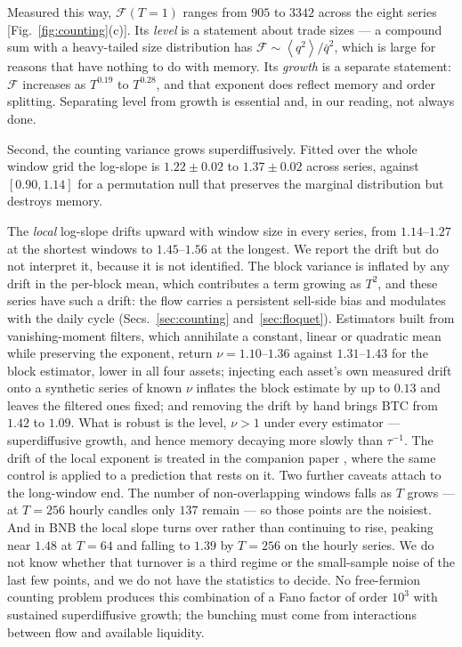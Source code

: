 \documentclass[aps,pre,twocolumn,superscriptaddress,floatfix,nofootinbib]{revtex4-2}
\newcommand{\avg}[1]{\left\langle #1 \right\rangle}
\begin{document}
Measured this way, $\mathcal{F}(T{=}1)$ ranges from $905$ to
$3342$ across the eight series [Fig.~\ref{fig:counting}(c)]. Its \emph{level}
is a statement about trade sizes --- a compound sum with a heavy-tailed size
distribution has $\mathcal{F}\sim\avg{q^2}/\bar q^{2}$, which is large for
reasons that have nothing to do with memory. Its \emph{growth} is a separate
statement: $\mathcal{F}$ increases as $T^{0.19}$ to $T^{0.28}$, and that
exponent does reflect memory and order splitting. Separating level from growth
is essential and, in our reading, not always done.

Second, the counting variance grows superdiffusively. Fitted over the whole
window grid the log-slope is $1.22\pm0.02$ to $1.37\pm0.02$ across series,
against $[0.90,1.14]$ for a permutation null that preserves the marginal
distribution but destroys memory.

The \emph{local} log-slope drifts upward with window size in every series, from
$1.14$--$1.27$ at the shortest windows to $1.45$--$1.56$ at the longest. We
report the drift but do not interpret it, because it is not identified. The
block variance is inflated by any drift in the per-block mean, which
contributes a term growing as $T^2$, and these series have such a drift: the
flow carries a persistent sell-side bias and modulates with the daily cycle
(Secs.~\ref{sec:counting} and~\ref{sec:floquet}). Estimators built from
vanishing-moment filters, which annihilate a constant, linear or quadratic
mean while preserving the exponent, return $\nu=1.10$--$1.36$ against
$1.31$--$1.43$ for the block estimator, lower in all four assets; injecting
each asset's own measured drift onto a synthetic series of known $\nu$ inflates
the block estimate by up to $0.13$ and leaves the filtered ones fixed; and
removing the drift by hand brings BTC from $1.42$ to $1.09$. What is robust is
the level, $\nu>1$ under every estimator --- superdiffusive growth, and hence
memory decaying more slowly than $\tau^{-1}$. The drift of the local exponent
is treated in the companion paper \cite{paper2}, where the same control is
applied to a prediction that rests on it. Two further caveats attach to the
long-window end. The number of non-overlapping windows falls as $T$ grows ---
at $T=256$ hourly candles only $137$ remain --- so those points are the
noisiest. And in BNB the local slope turns over rather than continuing to rise,
peaking near $1.48$ at $T=64$ and falling to $1.39$ by $T=256$ on the hourly
series. We do not know whether that turnover is a third regime or the
small-sample noise of the last few points, and we do not have the statistics to
decide.
No free-fermion counting problem produces this combination of a Fano factor of
order $10^3$ with sustained superdiffusive growth; the bunching must come from
interactions between flow and available liquidity.
\end{document}

